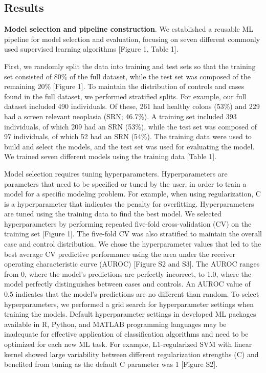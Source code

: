 \documentclass[
  11pt,
]{article}
\begin{document}
\hypertarget{results}{%
\subsection{Results}\label{results}}

\textbf{Model selection and pipeline construction}. We established a
reusable ML pipeline for model selection and evaluation, focusing on
seven different commonly used supervised learning algorithms {[}Figure
1, Table 1{]}.

First, we randomly split the data into training and test sets so that
the training set consisted of 80\% of the full dataset, while the test
set was composed of the remaining 20\% {[}Figure 1{]}. To maintain the
distribution of controls and cases found in the full dataset, we
performed stratified splits. For example, our full dataset included 490
individuals. Of these, 261 had healthy colons (53\%) and 229 had a
screen relevant neoplasia (SRN; 46.7\%). A training set included 393
individuals, of which 209 had an SRN (53\%), while the test set was
composed of 97 individuals, of which 52 had an SRN (54\%). The training
data were used to build and select the models, and the test set was used
for evaluating the model. We trained seven different models using the
training data {[}Table 1{]}.

Model selection requires tuning hyperparameters. Hyperparameters are
parameters that need to be specified or tuned by the user, in order to
train a model for a specific modeling problem. For example, when using
regularization, C is a hyperparameter that indicates the penalty for
overfitting. Hyperparameters are tuned using the training data to find
the best model. We selected hyperparameters by performing repeated
five-fold cross-validation (CV) on the training set {[}Figure 1{]}. The
five-fold CV was also stratified to maintain the overall case and
control distribution. We chose the hyperparameter values that led to the
best average CV predictive performance using the area under the receiver
operating characteristic curve (AUROC) {[}Figure S2 and S3{]}. The AUROC
ranges from 0, where the model's predictions are perfectly incorrect, to
1.0, where the model perfectly distinguishes between cases and controls.
An AUROC value of 0.5 indicates that the model's predictions are no
different than random. To select hyperparameters, we performed a grid
search for hyperparameter settings when training the models. Default
hyperparameter settings in developed ML packages available in R, Python,
and MATLAB programming languages may be inadequate for effective
application of classification algorithms and need to be optimized for
each new ML task. For example, L1-regularized SVM with linear kernel
showed large variability between different regularization strengths (C)
and benefited from tuning as the default C parameter was 1 {[}Figure
S2{]}.
\end{document}
